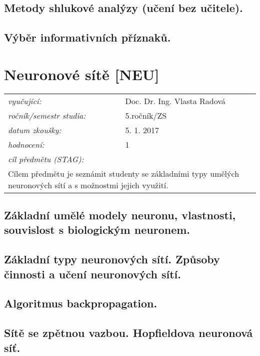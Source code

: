 \subsection{Metody shlukové analýzy (učení bez učitele).}

\subsection{Výběr informativních příznaků.}

\section{Neuronové sítě [NEU]}

\begin{table}[H]
\centering
\begin{tabular}{p{4cm} p{12cm}}
\textit{vyučující:}             & Doc. Dr. Ing. Vlasta Radová \\
\textit{ročník/semestr studia:} & 5.ročník/ZS \\
\textit{datum zkoušky:}         & 5. 1. 2017 \\
\textit{hodnocení:}             & 1 \\
\textit{cíl předmětu (STAG):}   & \\
\multicolumn{2}{p{16cm}}{Cílem předmětu je seznámit studenty se základními typy umělých neuronových sítí a s možnostmi jejich využití.}
\end{tabular}
\end{table}

\subsection{Základní umělé modely neuronu, vlastnosti, souvislost s biologickým neuronem.}

\subsection{Základní typy neuronových sítí. Způsoby činnosti a učení neuronových sítí.}

\subsection{Algoritmus backpropagation.}

\subsection{Sítě se zpětnou vazbou. Hopfieldova neuronová síť.}

